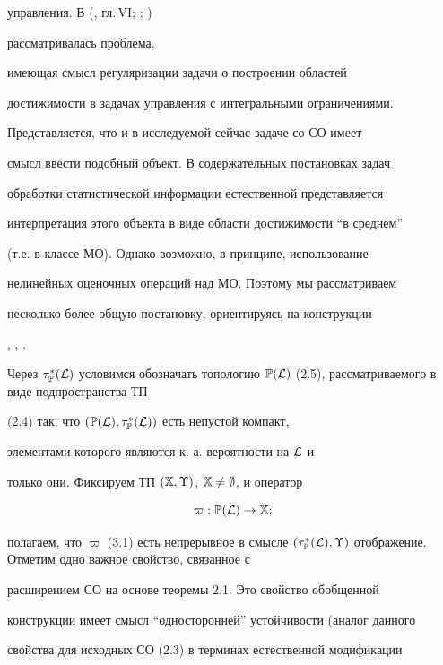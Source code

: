 управления. В (\cite{Ch1}, гл.\,VI; \cite{Ch4}; \cite{Ch5})


рассматривалась проблема,


имеющая смысл регуляризации задачи о построении областей


достижимости в задачах управления с интегральными ограничениями.


Представляется, что и в исследуемой сейчас задаче со СО имеет


смысл ввести подобный объект. В содержательных постановках задач


обработки статистической информации естественной представляется


интерпретация этого объекта в виде области достижимости ``в среднем''


(т.е. в классе МО). Однако возможно, в принципе, использование


нелинейных оценочных операций над МО. Поэтому мы рассматриваем


несколько более общую постановку, ориентируясь на конструкции


\cite{Ch4}, \cite{Ch5}, \cite{Ch6}.


Через $\tap$ условимся обозначать топологию ${\Bbb


P}({\cal L})$ (2.5), рассматриваемого в виде подпространства ТП


(2.4) так, что $({\Bbb P}({\cal L}), \tau^*_{\Bbb P}({\cal L}))$ есть непустой компакт,


элементами которого являются к.-а. вероятности на ${\cal L}$ и


только они. Фиксируем ТП $({\Bbb X}, \Upsilon)$, ${\Bbb X} \not=


\emp$, и оператор


%


\begin{equation}


\varpi: {\Bbb P}({\cal L}) \to {\Bbb X};


\end{equation}


%


полагаем, что $\varpi$ (3.1) есть непрерывное в смысле $(\tap,


\Upsilon)$ отображение. Отметим одно важное свойство, связанное с


расширением СО на основе теоремы 2.1. Это свойство обобщенной


конструкции имеет смысл ``односторонней'' устойчивости (аналог данного


свойства для исходных СО (2.3) в терминах естественной модификации


